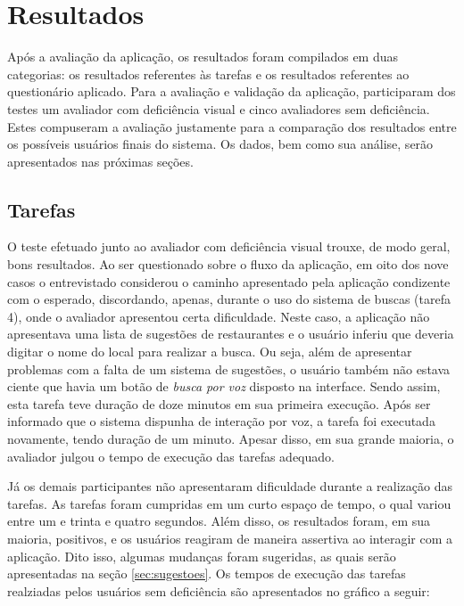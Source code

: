 \chapter{\label{chap:resultados}Resultados}

Após a avaliação da aplicação, os resultados foram compilados em duas categorias: os resultados referentes às tarefas e os resultados referentes ao questionário aplicado. Para a avaliação e validação da aplicação, participaram dos testes um avaliador com deficiência visual e cinco avaliadores sem deficiência. Estes compuseram a avaliação justamente para a comparação dos resultados entre os possíveis usuários finais do sistema. Os dados, bem como sua análise, serão apresentados nas próximas seções.

\section{Tarefas}

O teste efetuado junto ao avaliador com deficiência visual trouxe, de modo geral, bons resultados. Ao ser questionado sobre o fluxo da aplicação, em oito dos nove casos o entrevistado considerou o caminho apresentado pela aplicação condizente com o esperado, discordando, apenas, durante o uso do sistema de buscas (tarefa 4), onde o avaliador apresentou certa dificuldade. Neste caso, a aplicação não apresentava uma lista de sugestões de restaurantes e o usuário inferiu que deveria digitar o nome do local para realizar a busca. Ou seja, além de apresentar problemas com a falta de um sistema de sugestões, o usuário também não estava ciente que havia um botão de \emph{busca por voz} disposto na interface. Sendo assim, esta tarefa teve duração de doze minutos em sua primeira execução. Após ser informado que o sistema dispunha de interação por voz, a tarefa foi executada novamente, tendo duração de um minuto. Apesar disso, em sua grande maioria, o avaliador julgou o tempo de execução das tarefas adequado.

Já os demais participantes não apresentaram dificuldade durante a realização das tarefas. As tarefas foram cumpridas em um curto espaço de tempo, o qual variou entre um e trinta e quatro segundos. Além disso, os resultados foram, em sua maioria, positivos, e os usuários reagiram de maneira assertiva ao interagir com a aplicação. Dito isso, algumas mudanças foram sugeridas, as quais serão apresentadas na seção \ref{sec:sugestoes}. Os tempos de execução das tarefas realziadas pelos usuários sem deficiência são apresentados no gráfico a seguir:

